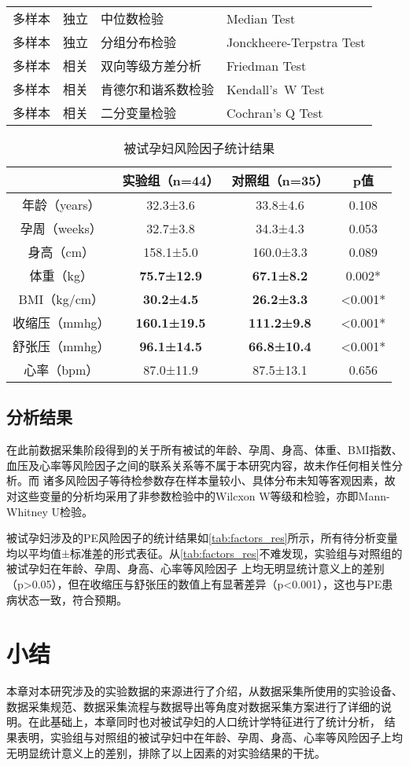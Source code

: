 \begin{center}
\begin{longtable}{m{1.8cm}<{\centering}m{2.5cm}<{\centering}m{5cm}<{\centering}m{6cm}<{\centering}}
            多样本   & 独立    & 中位数检验 & Median Test \\
            多样本   & 独立    & 分组分布检验 & Jonckheere-Terpstra Test \\
            多样本   & 相关    & 双向等级方差分析 & Friedman Test \\
            多样本   & 相关    & 肯德尔和谐系数检验 & Kendall's W Test \\
            多样本   & 相关    & 二分变量检验 & Cochran's Q Test \\
      \end{longtable}
\end{center}

\begin{table}[htbp]
      \centering
      \caption{\label{tab:factors_res}被试孕妇风险因子统计结果}
      \begin{tabular}{cccc}
      \toprule
            & \textbf{实验组（n=44）} & \textbf{对照组（n=35）} & \textbf{p值} \\
      \midrule
      年龄（years） & 32.3±3.6 & 33.8±4.6 & 0.108 \\
      孕周（weeks） & 32.7±3.8 & 34.3±4.3 & 0.053 \\
      身高（cm） & 158.1±5.0 & 160.0±3.3 & 0.089 \\
      体重（kg） & \textbf{75.7±12.9} & \textbf{67.1±8.2} & 0.002* \\
      BMI（kg/cm） & \textbf{30.2±4.5} & \textbf{26.2±3.3} & <0.001* \\
      收缩压（mmhg） & \textbf{160.1±19.5} & \textbf{111.2±9.8} & <0.001* \\
      舒张压（mmhg） & \textbf{96.1±14.5} & \textbf{66.8±10.4} & <0.001* \\
      心率（bpm） & 87.0±11.9 & 87.5±13.1 & 0.656 \\
      \bottomrule
      \end{tabular}%
\end{table}%
\subsection{分析结果}
在此前数据采集阶段得到的关于所有被试的年龄、孕周、身高、体重、BMI指数、血压及心率等风险因子之间的联系关系等不属于本研究内容，故未作任何相关性分析。而
诸多风险因子等待检参数存在样本量较小、具体分布未知等客观因素，故对这些变量的分析均采用了非参数检验中的Wilcxon W等级和检验，亦即Mann-Whitney U检验。

被试孕妇涉及的PE风险因子的统计结果如\autoref{tab:factors_res}所示，所有待分析变量均以平均值±标准差的形式表征。从\autoref{tab:factors_res}不难发现，实验组与对照组的被试孕妇在年龄、孕周、身高、心率等风险因子
上均无明显统计意义上的差别（p>0.05），但在收缩压与舒张压的数值上有显著差异（p<0.001），这也与PE患病状态一致，符合预期。
\section{小结}
本章对本研究涉及的实验数据的来源进行了介绍，从数据采集所使用的实验设备、数据采集规范、数据采集流程与数据导出等角度对数据采集方案进行了详细的说明。在此基础上，本章同时也对被试孕妇的人口统计学特征进行了统计分析，
结果表明，实验组与对照组的被试孕妇中在年龄、孕周、身高、心率等风险因子上均无明显统计意义上的差别，排除了以上因素的对实验结果的干扰。